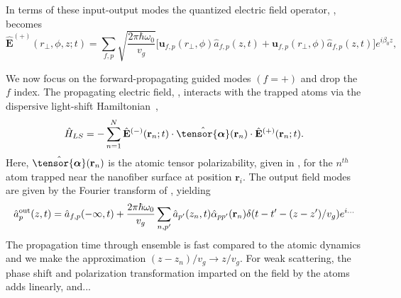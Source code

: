 \documentclass[preprint,aps,pra,onecolumn]{revtex4-1} %
\newcommand{\poltens}{\hat{\tensor{\boldsymbol{\alpha}}}}
\newcommand{\change}[1]{{\color{RoyalBlue} #1}}
\begin{document}
In terms of these input-output modes the quantized electric field operator, , becomes
	\begin{equation} \label{Eq::PropagatingElectricField}
		\hat{\mathbf{E}}^{(+)}(r\!_\perp,\phi,z;t) = \sum_{f,p} \sqrt{ \frac{2 \pi \hbar \omega_0}{ v_g} } \big[ \mathbf{u}_{f,p}(r\!_\perp,\phi) \hat{a}_{f,p}(z,t) + \mathbf{u}_{f,p}(r\!_\perp,\phi) \hat{a}_{f,p}(z,t) \big] e^{i \beta_0 z},
	\end{equation}
	
We now focus on the forward-propagating guided modes $(f=+)$ and drop the $f$ index.  	The propagating electric field, , interacts with the trapped atoms via the dispersive light-shift Hamiltonian~\cite{deutsch_quantum_2010,kien_dynamical_2013},
	\begin{equation} \label{Eq::LightShiftHam}
		\hat{H}_{LS} = - \sum_{n=1}^N \hat{\mathbf{E}}^{(-)}(\mathbf{r}_n ; t ) \cdot \poltens(\mbf{r}_n) \cdot \hat{\mathbf{E}}^{(+)}(\mathbf{r}_n ;t ).
	\end{equation}
Here, $\poltens(\br_n)$ is the atomic tensor polarizability, given in , for the $n^{th}$ atom trapped near the nanofiber surface at position $\mathbf{r}_i$. The output field modes are given by the Fourier transform of , yielding \cite{le_kien_correlations_2008} \change{
	\begin{align} \label{Eq::ScatteringSolution}
		\hat{a}^{\rm out}_{p}(z,t) = \hat{a}_{f,p}(-\infty,t) + \frac{2\pi \hbar \omega_0}{v_g} \sum_{n,p'} \hat{a}_{p'}(z_n,t) \hat{\alpha}_{pp'}(\mathbf{r}_n) \delta(t-t'- (z-z')/v_g)e^{i\dots}
	\end{align} 
The propagation time through ensemble is fast compared to the atomic dynamics and we make the approximation $(z-z_n)/v_g \rightarrow z/v_g$.  For weak scattering, the phase shift and polarization transformation imparted on the field by the atoms adds linearly, and...}
\end{document}
